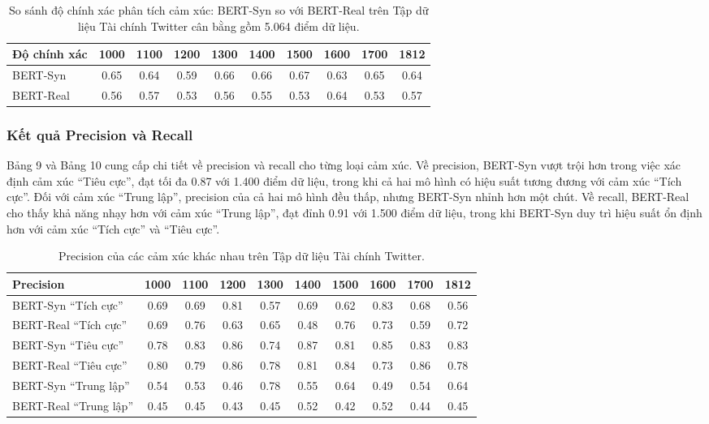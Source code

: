 \documentclass[a4paper,10pt]{article}
\begin{document}
\begin{table}[h]
    \renewcommand{\thetable}{8}
    \centering
    \caption{So sánh độ chính xác phân tích cảm xúc: BERT-Syn so với BERT-Real trên Tập dữ liệu Tài chính Twitter cân bằng gồm 5.064 điểm dữ liệu.}
    \label{tab:accuracy_twitter}
    \begin{tabular}{lccccccccc}
        \hline
        Độ chính xác & 1000 & 1100 & 1200 & 1300 & 1400 & 1500 & 1600 & 1700 & 1812 \\
        \hline
        BERT-Syn  & 0.65 & 0.64 & 0.59 & 0.66 & 0.66 & 0.67 & 0.63 & 0.65 & 0.64 \\
        BERT-Real & 0.56 & 0.57 & 0.53 & 0.56 & 0.55 & 0.53 & 0.64 & 0.53 & 0.57 \\
        \hline
    \end{tabular}
\end{table}


\subsubsection{ Kết quả Precision và Recall}

Bảng 9 và Bảng 10 cung cấp chi tiết về precision và recall cho từng loại cảm xúc. Về precision, BERT-Syn vượt trội hơn trong việc xác định cảm xúc “Tiêu cực”, đạt tối đa 0.87 với 1.400 điểm dữ liệu, trong khi cả hai mô hình có hiệu suất tương đương với cảm xúc “Tích cực”. Đối với cảm xúc “Trung lập”, precision của cả hai mô hình đều thấp, nhưng BERT-Syn nhỉnh hơn một chút. Về recall, BERT-Real cho thấy khả năng nhạy hơn với cảm xúc “Trung lập”, đạt đỉnh 0.91 với 1.500 điểm dữ liệu, trong khi BERT-Syn duy trì hiệu suất ổn định hơn với cảm xúc “Tích cực” và “Tiêu cực”.

\begin{table}[h]
    \renewcommand{\thetable}{9}
    \centering
    \caption{Precision của các cảm xúc khác nhau trên Tập dữ liệu Tài chính Twitter.}
    \label{tab:precision_twitter}
    \begin{tabular}{lccccccccc}
        \hline
        Precision & 1000 & 1100 & 1200 & 1300 & 1400 & 1500 & 1600 & 1700 & 1812 \\
        \hline
        BERT-Syn “Tích cực”  & 0.69 & 0.69 & 0.81 & 0.57 & 0.69 & 0.62 & 0.83 & 0.68 & 0.56 \\
        BERT-Real “Tích cực” & 0.69 & 0.76 & 0.63 & 0.65 & 0.48 & 0.76 & 0.73 & 0.59 & 0.72 \\
        BERT-Syn “Tiêu cực”  & 0.78 & 0.83 & 0.86 & 0.74 & 0.87 & 0.81 & 0.85 & 0.83 & 0.83 \\
        BERT-Real “Tiêu cực” & 0.80 & 0.79 & 0.86 & 0.78 & 0.81 & 0.84 & 0.73 & 0.86 & 0.78 \\
        BERT-Syn “Trung lập” & 0.54 & 0.53 & 0.46 & 0.78 & 0.55 & 0.64 & 0.49 & 0.54 & 0.64 \\
        BERT-Real “Trung lập” & 0.45 & 0.45 & 0.43 & 0.45 & 0.52 & 0.42 & 0.52 & 0.44 & 0.45 \\
        \hline
    \end{tabular}
\end{table}
\end{document}
